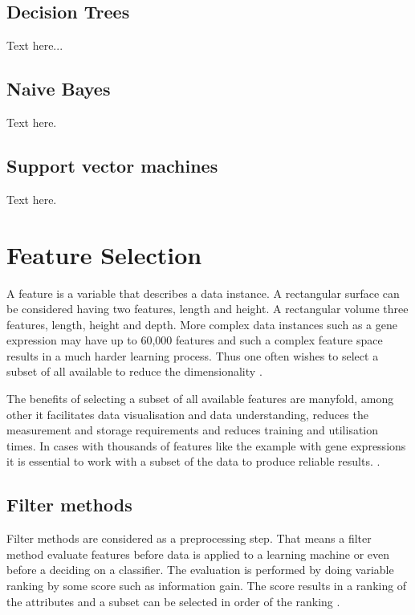 \subsection{Decision Trees}

Text here...

\subsection{Naive Bayes}

Text here.

\subsection{Support vector machines}

Text here.

\section{Feature Selection}

A feature is a variable that describes a data instance. A rectangular surface can be considered having two features, length and height. A rectangular volume three features, length, height and depth. More complex data instances such as a gene expression may have up to 60,000 features and such a complex feature space results in a much harder learning process. Thus one often wishes to select a subset of all available to reduce the dimensionality \parencite{guyon2003}.

The benefits of selecting a subset of all available features are manyfold, among other it facilitates data visualisation and data understanding, reduces the measurement and storage requirements and reduces training and utilisation times. In cases with thousands of features like the example with gene expressions it is essential to work with a subset of the data to produce reliable results. \parencite{guyon2003}.


\subsection{Filter methods}

Filter methods are considered as a preprocessing step. That means a filter method evaluate features before data is applied to a learning machine or even before a deciding on a classifier. The evaluation is performed by doing variable ranking by some score such as information gain. The score results in a ranking of the attributes and a subset can be selected in order of the ranking \parencite{guyon2003}.

